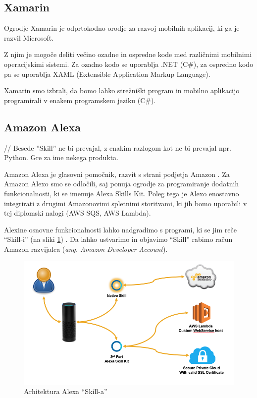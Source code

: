 \documentclass[a4paper, 12pt]{book}
\begin{document}
\subsection{Xamarin}

Ogrodje Xamarin \cite{xamarin} je odprtokodno orodje za razvoj mobilnih aplikacij, ki ga je razvil Microsoft. 

Z njim je mogoče deliti večino ozadne in ospredne kode med različnimi mobilnimi operacijskimi sistemi. 
Za ozadno kodo se uporablja .NET (C\#), za ospredno kodo pa se uporablja XAML (Extensible Application Markup Language).

Xamarin smo izbrali, da bomo lahko strežniški program in mobilno aplikacijo programirali v enakem programskem jeziku (C\#).

\subsection{Amazon Alexa}

// Besede ''Skill'' ne bi prevajal, z enakim razlogom kot ne bi prevajal npr. Python. Gre za ime nekega produkta.

Amazon Alexa je glasovni pomočnik, razvit s strani podjetja Amazon \cite{alexa}.
Za Amazon Alexo smo se odločili, saj ponuja ogrodje za programiranje dodatnih funkcionalnosti, ki se imenuje Alexa Skills Kit.
Poleg tega je Alexo enostavno integrirati z drugimi Amazonovimi spletnimi storitvami, ki jih bomo uporabili v tej diplomski nalogi (AWS SQS, AWS Lambda).


Alexine osnovne funkcionalnosti lahko nadgradimo s programi, ki se jim reče \enquote{Skill-i} (na sliki \ref{alexa_architecture}) \cite{alexaskills, alexaarchitecture}.
Da lahko ustvarimo in objavimo \enquote{Skill} rabimo račun Amazon razvijalca (\textit{ang. Amazon Developer Account}).

\begin{figure}[H]
\begin{center}
\includegraphics[width=13cm]{alexa_architecture}
\end{center}
\caption{Arhitektura Alexa \enquote{Skill-a}}
\label{alexa_architecture}
\end{figure}
\end{document}
